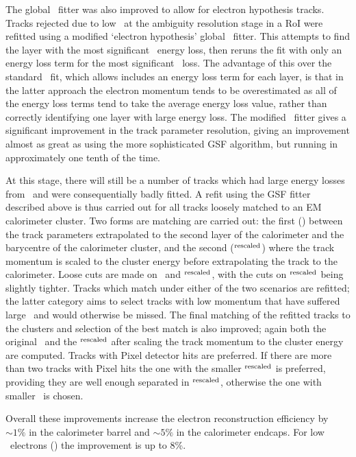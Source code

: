 The global \chisquared\
fitter was also improved to allow for electron hypothesis tracks. Tracks
rejected due to low \chisquared\ at the ambiguity resolution stage in a RoI were
refitted using a modified `electron hypothesis' global \chisquared\ fitter. This
attempts to find the layer with the most significant \brem\ energy loss, then
reruns the fit with only an energy loss term for the most significant \brem\
loss. The advantage of this over the standard \chisquared\ fit, which allows
includes an energy loss term for each layer, is that in the latter approach the
electron momentum tends to be overestimated as all of the energy loss terms tend
to take the average energy loss value, rather than correctly identifying one layer with large
energy loss. The modified \chisquared\ fitter gives a significant improvement in the track
parameter resolution, giving an improvement almost as great as using the more
sophisticated GSF algorithm, but running in approximately one tenth of the time.

At this stage, there will still be a number of tracks which had large energy
losses from \brem\ and were consequentially badly fitted. A refit using the GSF
fitter described above is thus carried out for all tracks loosely matched to an
EM calorimeter cluster. Two forms are matching are carried out: the first
(\deltaR) between the
track parameters extrapolated to the second layer of the calorimeter and the
barycentre of the calorimeter cluster, and the second (\deltaR$^{\rm{rescaled}}$) where the track momentum is
scaled to the cluster energy before extrapolating the track to the calorimeter.
Loose cuts are made on \deltaR\ and \deltaR$^{\rm{rescaled}}$, with the cuts on
\deltaR$^{\rm{rescaled}}$ being slightly tighter.
Tracks which match under either of the two scenarios are refitted; the latter
category aims to select tracks with low momentum that have suffered large
\brem\ and would otherwise be missed. The final matching of the refitted tracks
to the clusters and selection of the best match is also improved; again both the
original \deltaR\ and the \deltaR$^{\rm{rescaled}}$ after scaling the track
momentum to the cluster
energy are computed. Tracks with Pixel detector hits are preferred. If there are
more than two tracks with Pixel hits the one with the smaller
\deltaR$^{\rm{rescaled}}$ is preferred, providing they are well enough
separated in \deltaR$^{\rm{rescaled}}$, otherwise the one with smaller \deltaR\
is chosen.

Overall these improvements increase the electron reconstruction efficiency by
$\sim1\%$ in the calorimeter barrel and $\sim5\%$ in the calorimeter endcaps.
For low \et\ electrons () the improvement is up to 8\%.

